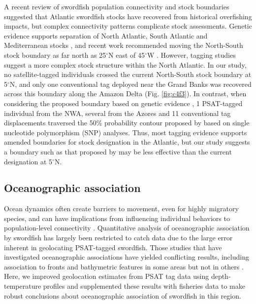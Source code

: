 A recent review of swordfish population connectivity and stock boundaries \citep{Neilson2013} suggested that Atlantic swordfish stocks have recovered from historical overfishing impacts, but complex connectivity patterns complicate stock assessments. Genetic evidence supports separation of North Atlantic, South Atlantic and Mediterranean stocks \citep{Bremer1996, AlvaradoBremer2005a, Smith2015}, and recent work recommended moving the North-South stock boundary as far north as 25$^{\circ}$N east of 45$^{\circ}$W \citep{Smith2015}. However, tagging studies \citep{Abascal2015} suggest a more complex stock structure within the North Atlantic. In our study, no satellite-tagged individuals crossed the current North-South stock boundary at 5$^{\circ}$N, and only one conventional tag deployed near the Grand Banks was recovered across this boundary along the Amazon Delta (Fig. \ref{fig:c4f3}). In contrast, when considering the proposed boundary based on genetic evidence \citep{Smith2015}, 1 PSAT-tagged individual from the NWA, several from the Azores and 11 conventional tag displacements traversed the 50\% probability contour proposed by \citet{Smith2015} based on single nucleotide polymorphism (SNP) analyses. Thus, most tagging evidence supports amended boundaries for stock designation in the Atlantic, but our study suggests a boundary such as that proposed by \citet{Smith2015} may be less effective than the current designation at 5$^{\circ}$N.

\subsection{Oceanographic association}

Ocean dynamics often create barriers to movement, even for highly migratory species, and can have implications from influencing individual behaviors \citep{Stramma2012} to population-level connectivity \citep{Galarza2009, Selkoe2010}. Quantitative analysis of oceanographic association by swordfish has largely been restricted to catch data \citep[\eg][]{Podesta1993} due to the large error inherent in geolocating PSAT-tagged swordfish. Those studies that have investigated oceanographic associations have yielded conflicting results, including association to fronts and bathymetric features in some areas \citep{Sedberry2001} but not in others \citep{Abascal2010}. Here, we improved geolocation estimates from PSAT tag data using depth-temperature profiles and supplemented these results with fisheries data to make robust conclusions about oceanographic association of swordfish in this region.

